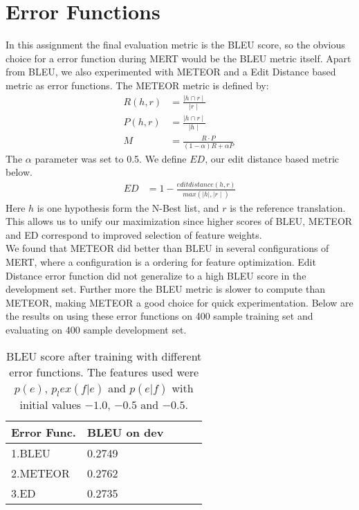 \documentclass[11pt]{article}
\begin{document}
 \section{Error Functions}
In this assignment the final evaluation metric is the BLEU score, so the obvious
choice for a error function during MERT would be the BLEU metric itself. Apart
from BLEU, we also experimented with METEOR and a Edit Distance based metric as
error functions. The METEOR metric is defined by:
\begin{align*}
R(h,r) &= \frac{\mid h \cap r \mid}{\mid r \mid}\\
P(h,r) &= \frac{\mid h \cap r \mid}{\mid h \mid}\\
M &= \frac{R \cdot P}{(1-\alpha)R + \alpha P}\
\end{align*}
The $\alpha$ parameter was set to 0.5. We define $ED$, our edit distance based
metric below.
\begin{align*}
ED &= 1 - \frac{editdistance(h,r)}{max(\mid h \mid , \mid r \mid)}
\end{align*}
Here $h$ is one hypothesis form the N-Best list, and $r$ is the reference
translation. This allows us to unify our maximization since higher scores of
BLEU, METEOR and ED correspond to improved selection of feature weights.\\
We found that METEOR did better than BLEU in several configurations of
MERT, where a configuration is a ordering for feature optimization. Edit
Distance error function did not generalize to a high BLEU score in the
development set.
Further more the BLEU metric is slower to compute than METEOR, making METEOR a
good choice for quick experimentation. Below are the results on using these
error functions on 400 sample training set and evaluating on 400
sample development set.
\begin{table}[h]
\begin{center}
\begin{singlespace}
\begin{tabular}{|l|l|l|l|l|}
\hline \bf Error Func. &  \bf BLEU on dev \\ \hline
1.BLEU & 0.2749 \\
2.METEOR & 0.2762\\
3.ED & 0.2735\\
\hline
\end{tabular}
\end{singlespace}
\end{center}
\caption{ BLEU score after training with different error functions. The features
used were $p(e)$, $p_lex(f|e)$ and $p(e|f)$ with initial values $-1.0$, $-0.5$
and $-0.5$.}
\end{table}
\end{document}
